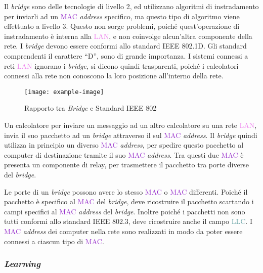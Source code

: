 \documentclass{article}
\numberwithin{equation}{subsection}
\begin{document}
Il \textit{bridge} sono delle tecnologie di livello 2, ed utilizzano algoritmi di instradamento per inviarli ad un \textcolor{DarkOrchid}{MAC} \textit{address} specifico, ma questo tipo di 
algoritmo viene effettuato a livello 3. Questo non sorge problemi, poiché quest'operazione di instradamento è interna alla \textcolor{violet}{LAN}, e non coinvolge alcun'altra componente 
della rete. I \textit{bridge} devono essere conformi allo standard IEEE 802.1D. Gli standard comprendenti il carattere ``D'', sono di grande importanza. 
I sistemi connessi a reti \textcolor{violet}{LAN} ignorano i \textit{bridge}, si dicono quindi trasparenti, poiché i calcolatori connessi alla rete non conoscono la loro posizione all'interno della 
rete. 

\begin{figure}[H]%
    \centering%
    \texttt{[image: example-image]}%
    \caption{Rapporto tra \textit{Bridge} e Standard IEEE 802}%
\end{figure}

Un calcolatore per inviare un messaggio ad un altro calcolatore su una rete \textcolor{violet}{LAN}, invia il suo pacchetto ad un \textit{bridge} attraverso il sul \textcolor{DarkOrchid}{MAC} \textit{address}. Il \textit{bridge} quindi 
utilizza in principio un diverso \textcolor{DarkOrchid}{MAC} \textit{address}, per spedire questo pacchetto al computer di destinazione tramite il suo \textcolor{DarkOrchid}{MAC} \textit{address}. Tra questi due \textcolor{DarkOrchid}{MAC} è presenta un 
componente di relay, per trasmettere il pacchetto tra porte diverse del \textit{bridge}. 


Le porte di un \textit{bridge} possono avere lo stesso \textcolor{DarkOrchid}{MAC} o \textcolor{DarkOrchid}{MAC} differenti. Poiché il pacchetto è specifico al \textcolor{DarkOrchid}{MAC} del \textit{bridge}, deve ricostruire il pacchetto scartando i campi 
specifici al \textcolor{DarkOrchid}{MAC} \textit{address} del \textit{bridge}. Inoltre poiché i pacchetti non sono tutti conformi allo standard IEEE 802.3, deve ricostruire anche il campo \textcolor{CadetBlue}{LLC}. I \textcolor{DarkOrchid}{MAC} \textit{address} 
dei computer nella rete sono realizzati in modo da poter essere connessi a ciascun tipo di \textcolor{DarkOrchid}{MAC}. 

\subsubsection{\textit{Learning}}
\end{document}
